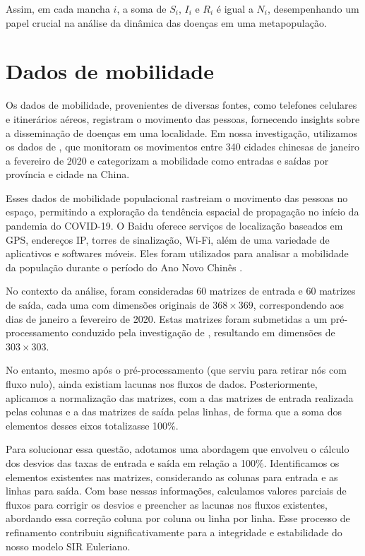 Assim, em cada mancha $i$, a soma de $S_{i}$, $I_{i}$ e $R_{i}$ é igual a $N_{i}$, desempenhando um papel crucial na análise da dinâmica das doenças em uma metapopulação.

\section{Dados de mobilidade}
Os dados de mobilidade, provenientes de diversas fontes, como telefones celulares e itinerários aéreos, registram o movimento das pessoas, fornecendo insights sobre a disseminação de doenças em uma localidade. Em nossa investigação, utilizamos os dados de , que monitoram os movimentos entre 340 cidades chinesas de janeiro a fevereiro de 2020 e categorizam a mobilidade como entradas e saídas por província e cidade na China.

Esses dados de mobilidade populacional rastreiam o movimento das pessoas no espaço, permitindo a exploração da tendência espacial de propagação no início da pandemia do COVID-19. O Baidu oferece serviços de localização baseados em GPS, endereços IP, torres de sinalização, Wi-Fi, além de uma variedade de aplicativos e softwares móveis. Eles foram utilizados para analisar a mobilidade da população durante o período do Ano Novo Chinês \cite{HU2020130}.

No contexto da análise, foram consideradas 60 matrizes de entrada e 60 matrizes de saída, cada uma com dimensões originais de $368 \times 369$, correspondendo aos dias de janeiro a fevereiro de 2020. Estas matrizes foram submetidas a um pré-processamento conduzido pela investigação de , resultando em dimensões de $303 \times 303$.

No entanto, mesmo após o pré-processamento (que serviu para retirar nós com fluxo nulo), ainda existiam lacunas nos fluxos de dados. Posteriormente, aplicamos a normalização das matrizes, com a das matrizes de entrada realizada pelas colunas e a das matrizes de saída pelas linhas, de forma que a soma dos elementos desses eixos totalizasse 100\%.

Para solucionar essa questão, adotamos uma abordagem que envolveu o cálculo dos desvios das taxas de entrada e saída em relação a 100\%. Identificamos os elementos existentes nas matrizes, considerando as colunas para entrada e as linhas para saída. Com base nessas informações, calculamos valores parciais de fluxos para corrigir os desvios e preencher as lacunas nos fluxos existentes, abordando essa correção coluna por coluna ou linha por linha. Esse processo de refinamento contribuiu significativamente para a integridade e estabilidade do nosso modelo SIR Euleriano.